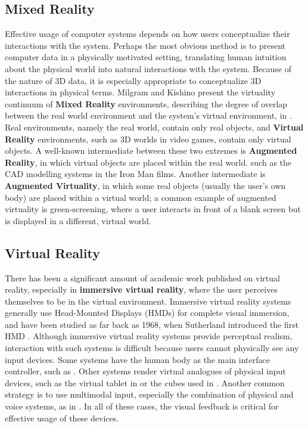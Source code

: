 \documentclass[pageno]{jpaper}
\begin{document}
\subsection{Mixed Reality}
Effective usage of computer systems depends on how users conceptualize their interactions with the system.
Perhaps the most obvious method is to present computer data in a physically motivated setting, translating
human intuition about the physical world into natural interactions with the system. Because of the nature of 3D data,
it is especially appropriate to conceptualize 3D interactions in physical terms. Milgram and Kishino present
the virtuality continuum of {\bf Mixed Reality} environments, describing the degree of overlap between the
real world environment and the system's virtual environment, in \cite{milgram1994taxonomy}. Real environments, namely
the real world, contain only real objects, and {\bf Virtual Reality} environments, such as 3D worlds in video games, contain only
virtual objects. A well-known intermediate between these two extremes is {\bf Augmented Reality}, in which virtual
objects are placed within the real world. such as the CAD modelling systems in the Iron Man films. Another intermediate is
{\bf Augmented Virtuality}, in which some real objects (usually the user's own body) are placed within a virtual world; a common
example of augmented virtuality is green-screening, where a user interacts in front of a blank screen but is displayed in a
different, virtual world.

\subsection{Virtual Reality}
There has been a significant amount of academic work published on virtual reality, especially
in {\bf immersive virtual reality}, where the user perceives themselves to be in the virtual environment. Immersive
virtual reality systems generally use Head-Mounted Displays (HMDs) for complete visual immersion, and have been studied
as far back as 1968, when Sutherland introduced the first HMD \cite{sutherland1968head}. Although immersive virtual reality
systems provide perceptual realism, interaction with such systems is difficult because users cannot physically see any input devices.
Some systems have the human body as the main interface controller, such as \cite{laviola1999whole, laviola1999flex}. Other systems render
virtual analogues of physical input devices, such as the virtual tablet in \cite{poupyrev1998virtual} or the cubes used in \cite{mine1997exploiting}.
Another common strategy is to use multimodal input, especially the combination of physical and voice systems, as in \cite{bolt1980put}.
In all of these cases, the visual feedback is critical for effective usage of these devices.
\end{document}
